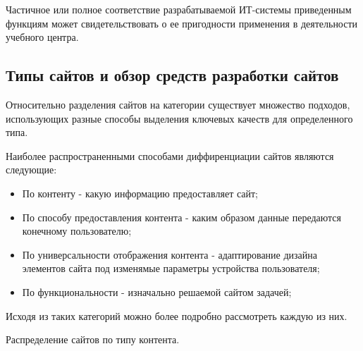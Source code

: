 Частичное или полное соответствие разрабатываемой ИТ-системы приведенным функциям может свидетельствовать о ее пригодности применения в деятельности учебного центра.

\subsection{Типы сайтов и обзор средств разработки сайтов}

Относительно разделения сайтов на категории существует множество подходов, использующих разные способы выделения ключевых качеств для определенного типа.

Наиболее распространенными способами диффиренциации сайтов являются следующие:
\begin{itemize}
	\item По контенту - какую информацию предоставляет сайт;
	\item По способу предоставления контента - каким образом данные передаются конечному пользователю;
	\item По универсальности отображения контента - адаптирование дизайна элементов сайта под изменямые параметры устройства пользователя;
	\item По функциональности - изначально решаемой сайтом задачей;
\end{itemize}

Исходя из таких категорий можно более подробно рассмотреть каждую из них.

Распределение сайтов по типу контента.

